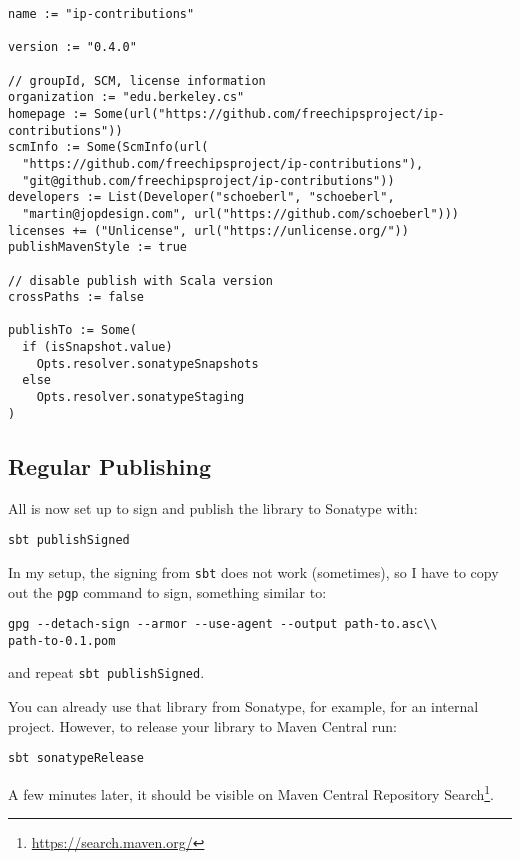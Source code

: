 \documentclass[%
    10pt,
    headinclude, footexclude,
    openright, %
    notitlepage,
    cleardoubleempty,
    headsepline,
    pointlessnumbers,
    bibtotoc, idxtotoc,
    ]{scrbook}
\newcommand{\code}[1]{{\lstinline[basicstyle=\small\ttfamily]{#1}}}
\newcommand{\myref}[2]{\href{#1}{#2}}
\renewcommand{\myref}[2]{{#2}{\footnote{\url{#1}}}}
\begin{document}
{\small
\begin{verbatim}
name := "ip-contributions"

version := "0.4.0"

// groupId, SCM, license information
organization := "edu.berkeley.cs"
homepage := Some(url("https://github.com/freechipsproject/ip-contributions"))
scmInfo := Some(ScmInfo(url(
  "https://github.com/freechipsproject/ip-contributions"),
  "git@github.com/freechipsproject/ip-contributions"))
developers := List(Developer("schoeberl", "schoeberl",
  "martin@jopdesign.com", url("https://github.com/schoeberl")))
licenses += ("Unlicense", url("https://unlicense.org/"))
publishMavenStyle := true

// disable publish with Scala version
crossPaths := false

publishTo := Some(
  if (isSnapshot.value)
    Opts.resolver.sonatypeSnapshots
  else
    Opts.resolver.sonatypeStaging
)
\end{verbatim}
}

\subsection{Regular Publishing}

All is now set up to sign and publish the library to Sonatype with:

\begin{verbatim}
sbt publishSigned
\end{verbatim}

In my setup, the signing from \code{sbt} does not work (sometimes), so I have to copy
out the \code{pgp} command to sign, something similar to:

\begin{verbatim}
gpg --detach-sign --armor --use-agent --output path-to.asc\\
path-to-0.1.pom
\end{verbatim}

\noindent and repeat \code{sbt publishSigned}.

You can already use that library from Sonatype, for example, for an internal project.
However, to release your library to Maven Central run:

\begin{verbatim}
sbt sonatypeRelease
\end{verbatim}

A few minutes later, it should be visible on \myref{https://search.maven.org/}{Maven Central
Repository Search}.
\end{document}
